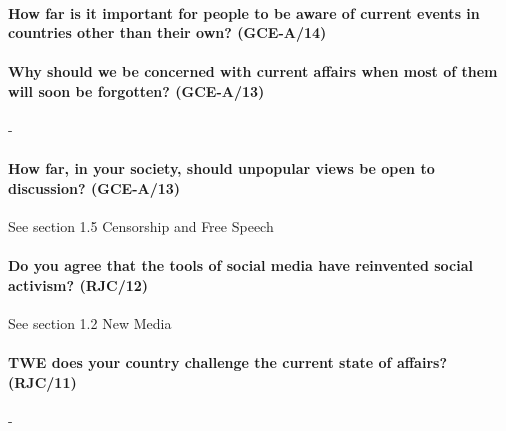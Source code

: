 \documentclass[../../main]{subfiles}
\begin{document}
\paragraph{How far is it important for people to be aware of current events in countries other than their own? (GCE-A/14)}

\paragraph{Why should we be concerned with current affairs when most of them will soon be forgotten? (GCE-A/13)}-

\paragraph{How far, in your society, should unpopular views be open to discussion? (GCE-A/13)} See section 1.5 Censorship and Free Speech

\paragraph{Do you agree that the tools of social media have reinvented social activism? (RJC/12)} See section 1.2 New Media

\paragraph{TWE does your country challenge the current state of affairs? (RJC/11)}-
\end{document}
